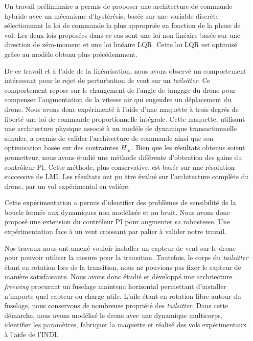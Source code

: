 {Un travail préliminaire a permis de proposer une architecture de commande hybride avec un mécanisme d'hystérésis, basée sur une variable discrète sélectionnant la loi de commande la plus appropriée en fonction de la phase de vol. Les deux lois proposées dans ce cas sont une loi non linéaire basée sur une direction de zéro-moment et une loi linéaire LQR. Cette loi LQR est optimisé grâce au modèle obtenu plus précédemment.

De ce travail et à l'aide de la linéarisation, nous avons observé un comportement intéressant pour le rejet de perturbation de vent sur un \textit{tailsitter}. Ce comportement repose sur le changement de l'angle de tangage du drone pour compenser l'augmentation de la vitesse air qui engendre un déplacement du drone. Nous avons donc expérimenté à l'aide d'une maquette à trois degrés de liberté une loi de commande proportionnelle intégrale. Cette maquette, utilisant une architecture physique associé à un modèle de dynamique transactionnelle simuler, a permis de valider l'architecture de commande ainsi que son optimisation basée sur des contraintes $H_{\infty}$.
Bien que les résultats obtenus soient prometteur, nous avons étudié une méthode différente d'obtention des gains du contrôleur PI. Cette méthode, plus conservative, est basée sur une résolution successive de LMI. Les résultats ont pu être évalué sur l'architecture complète du drone, par un vol expérimental en volière.

Cette expérimentation a permis d'identifier des problèmes de sensibilité de la boucle fermée aux dynamiques non modélisée et au bruit. Nous avons donc proposé une extension du contrôleur PI pour augmenter sa robustesse. Une expérimentation face à un vent croissant par palier à valider notre travail.

Nos travaux nous ont amené vouloir installer un capteur de vent sur le drone pour pouvoir utiliser la mesure pour la transition. Toutefois, le corps du \textit{tailsitter} étant en rotation lors de la transition, nous ne pouvions pas fixer le capteur de manière satisfaisante. Nous avons donc étudié et développé une architecture \textit{freewing} procurant un fuselage maintenu horizontal permettant d'installer n'importe quel capteur ou charge utile. L'aile étant en rotation libre autour du fuselage, nous conservons de nombreuse propriété des \textit{tailsitter}. Dans cette démarche, nous avons modélisé le drone avec une dynamique multicorps, identifier les paramètres, fabriquer la maquette et réalisé des vols expérimentaux à l'aide de l'INDI.

}
